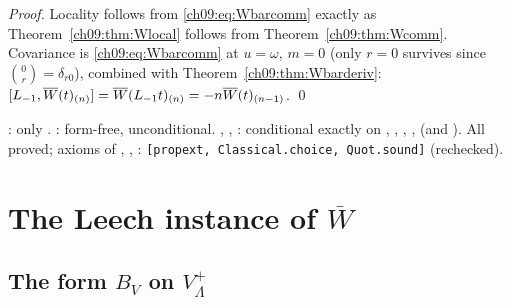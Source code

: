 \noindent\emph{Proof.} Locality follows from \eqref{ch09:eq:Wbarcomm} exactly as
Theorem~\ref{ch09:thm:Wlocal} follows from Theorem~\ref{ch09:thm:Wcomm}. Covariance is
\eqref{ch09:eq:Wbarcomm} at $u=\omega$, $m=0$ (only $r=0$ survives since $\binom0r=\delta_{r0}$),
combined with Theorem~\ref{ch09:thm:Wbarderiv}: $[L_{-1},\overline{W}(t)_{(n)}]=\overline{W}(L_{-1}t)_{(n)}=-n\overline{W}(t)_{(n-1)}$. \qed

\begin{status}
: only . : form-free, unconditional.
, , : conditional exactly on
, , , ,  (and ). All proved; axioms
of , , : \texttt{[propext, Classical.choice,
Quot.sound]} (rechecked).
\end{status}

\section{The Leech instance of \texorpdfstring{$\overline{W}$}{Wbar}}\label{ch09:sec:Wbarleech}

\subsection{The form \texorpdfstring{$B_V$}{B\_V} on \texorpdfstring{$V_\Lambda^+$}{V Lambda plus}}

